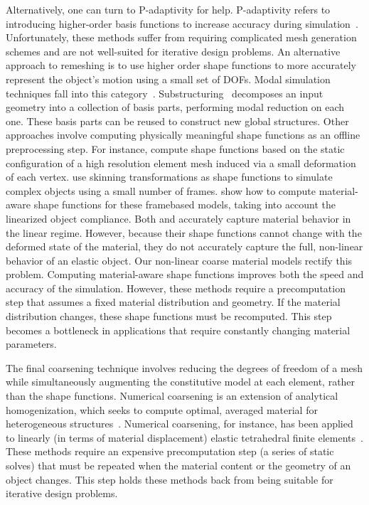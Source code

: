 Alternatively, one can turn to P-adaptivity for help.
P-adaptivity refers to introducing higher-order basis functions 
to increase accuracy during simulation~\citep{Szabo2004}.
Unfortunately, these methods suffer from requiring complicated mesh generation schemes and are not
well-suited for iterative design problems.
An alternative approach to remeshing is to use higher order shape
functions to more accurately represent the object's motion
using a small set of DOFs. Modal simulation techniques fall into
this category~\citep{Shabana1991,Krysl2001,Barbic:subspace:2005}.
Substructuring~\citep{Barbic2011} decomposes an input
geometry into a collection of basis parts, performing modal reduction on each one.
These basis parts can be reused to construct new global structures.
Other approaches involve computing physically meaningful shape functions as an
offline preprocessing step.
For instance, \cite{Nesme2009} compute shape functions based on
the static configuration of a high resolution element mesh induced
via a small deformation of each vertex.
\cite{Faure2011} use skinning transformations as shape functions to simulate complex
objects using a small number of frames.
\cite{Gilles2011} show how to compute material-aware shape functions for these framebased
models, taking into account the linearized object compliance.
Both \cite{Nesme2009} and \cite{Faure2011} accurately capture
material behavior in the linear regime.
However, because their shape functions cannot change with the deformed state of the material,
they do not accurately capture the full, non-linear behavior of an elastic object.
Our non-linear coarse material models rectify this problem.
Computing material-aware shape functions improves both the speed
and accuracy of the simulation. However, these methods require a
precomputation step that assumes a fixed material distribution and geometry.
If the material distribution changes, these shape functions
must be recomputed. This step becomes a bottleneck in applications
that require constantly changing material parameters.

The final coarsening technique involves reducing the degrees of freedom
of a mesh while simultaneously augmenting the constitutive
model at each element, rather than the shape functions.
Numerical coarsening is an extension of analytical homogenization, which seeks
to compute optimal,
averaged material for heterogeneous structures~\citep{Guedes1990,farmer2002}.
Numerical coarsening, for instance, has been applied to linearly
(in terms of material displacement)
elastic tetrahedral finite elements~\citep{Kharevych2009}.
These methods require an expensive precomputation step (a series
of static solves) that must be repeated when the material content or
the geometry of an object changes.
This step holds these methods back from being suitable for iterative design problems.
